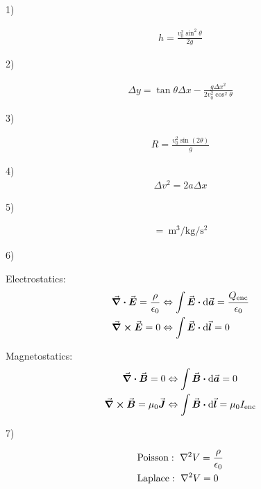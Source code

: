 \documentclass{article}
\begin{document}
   
1)

\begin{align*}
    h = \frac{v_0^2 \sin^2{\theta}}{2g} 
\end{align*}

\newpage

2)

\begin{align*}
    \Delta y = \tan{\theta} \Delta x - \frac{g \Delta x^2}{2 v_0^2 \cos^2{\theta}}
\end{align*}

\newpage

3) 

\begin{align*}
   R = \frac{v_0^2 \sin(2\theta)}{g} 
\end{align*}

\newpage

4) 
\begin{align*}
   \Delta v^2 = 2 a \Delta x 
\end{align*}

\newpage

5) 

\begin{align*}
    [G] = \SI[per-mode=fraction]{}{\m\cubed\per\kilo\gram\per\s\squared}
\end{align*}

\newpage

6)

Electrostatics:
\begin{align*}
    \grad \vdot \va*{E} = \frac{\rho}{\epsilon_0} &\Leftrightarrow \int \va*{E} \vdot \dd{\va*{a}} = \frac{Q_{\rm enc}}{\epsilon_0} \\
    \grad \cross \va*{E} = 0 &\Leftrightarrow \int \va*{E} \vdot \dd{\va*{l}} = 0
\end{align*}

Magnetostatics:
\begin{align*}
    \grad \vdot \va*{B} = 0 &\Leftrightarrow \int \va*{B} \vdot \dd{\va*{a}} = 0 \\
    \grad \cross \va*{B} = \mu_0 \va*{J} &\Leftrightarrow \int \va*{B} \vdot \dd{\va*{l}} = \mu_0 I_{\rm enc}
\end{align*}

\newpage

7) 

\begin{align*}
    &{\rm Poisson}:~ \laplacian V = \frac{\rho}{\epsilon_0} \\
    &{\rm Laplace}:~ \laplacian V = 0
\end{align*}
\end{document}
